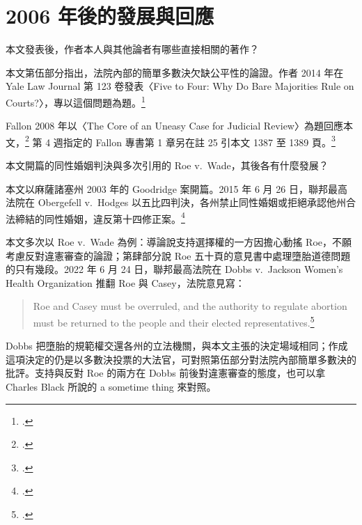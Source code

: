 \chapter{2006 年後的發展與回應}


\begin{qaquestion}
本文發表後，作者本人與其他論者有哪些直接相關的著作？
\end{qaquestion}

本文第伍部分指出，法院內部的簡單多數決欠缺公平性的論證。作者 2014 年在 Yale Law Journal 第 123 卷發表〈Five to Four: Why Do Bare Majorities Rule on Courts?〉\nobreak，專以這個問題為題。\footcite{waldron2014}

Fallon 2008 年以〈The Core of an Uneasy Case for Judicial Review〉為題回應本文，\footcite{fallon2008} 第 4 週指定的 Fallon 專書第 1 章另在註 25 引本文 1387 至 1389 頁。\footcite[181 註 25]{fallon2018}


\begin{qaquestion}
本文開篇的同性婚姻判決與多次引用的 Roe v.\ Wade，其後各有什麼發展？
\end{qaquestion}

本文以麻薩諸塞州 2003 年的 Goodridge 案開篇。2015 年 6 月 26 日，聯邦最高法院在 Obergefell v.\ Hodges 以五比四判決，各州禁止同性婚姻或拒絕承認他州合法締結的同性婚姻，違反第十四修正案。\footcite{obergefell2015}

本文多次以 Roe v.\ Wade 為例：導論說支持選擇權的一方因擔心動搖 Roe，不願考慮反對違憲審查的論證；第肆部分說 Roe 五十頁的意見書中處理墮胎道德問題的只有幾段。2022 年 6 月 24 日，聯邦最高法院在 Dobbs v.\ Jackson Women's Health Organization 推翻 Roe 與 Casey，法院意見寫：

\begin{quote}
Roe and Casey must be overruled, and the authority to regulate abortion must be returned to the people and their elected representatives.\footcite{dobbs2022}
\end{quote}

\begin{readernote}
Dobbs 把墮胎的規範權交還各州的立法機關，與本文主張的決定場域相同；作成這項決定的仍是以多數決投票的大法官，可對照第伍部分對法院內部簡單多數決的批評。支持與反對 Roe 的兩方在 Dobbs 前後對違憲審查的態度，也可以拿 Charles Black 所說的 a sometime thing 來對照。
\end{readernote}

